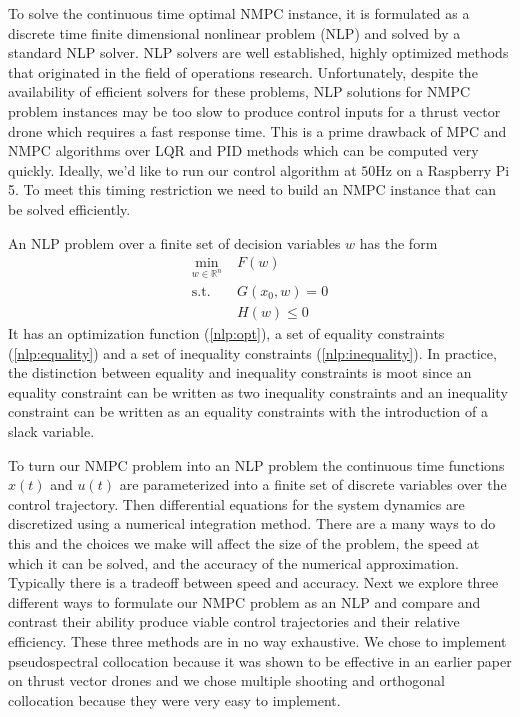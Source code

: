 \documentclass[]{article}
\newcommand{\mpc}{MPC}
\newcommand{\nmpc}{NMPC}
\newcommand{\R}{\mathbb{R}}
\begin{document}
	To solve the continuous time optimal {\nmpc} instance, it is formulated as a discrete time finite dimensional nonlinear problem (NLP) and solved by a standard NLP solver.  NLP solvers are well established, highly optimized methods that originated in the field of operations research. Unfortunately, despite the availability of efficient solvers for these problems, NLP solutions for {\nmpc} problem instances may be too slow to produce control inputs for a thrust vector drone which requires a fast response time. This is a prime drawback of {\mpc} and {\nmpc} algorithms over LQR and PID  methods which can be computed very quickly.
	Ideally, we'd like to run our control algorithm at $50$Hz on a Raspberry Pi 5.  To meet this timing restriction we need to build an {\nmpc} instance that can be solved efficiently. 

	An NLP problem over a finite set of decision variables $w$ has the form 
	\begin{align}
		\min_{w \in \R^n} \; &  F(w) \label{nlp:opt} \\
		\text{s.t.} \;\; & G(x_0, w) = 0 \label{nlp:equality} \\
		&	H(w) \leq 0 \label{nlp:inequality}
	\end{align}
	It has an optimization function (\ref{nlp:opt}),  a set of equality constraints (\ref{nlp:equality}) and a set of inequality constraints (\ref{nlp:inequality}).
	In practice, the distinction between equality and inequality constraints is moot since an equality constraint can be written as two inequality constraints  and  an inequality constraint can be written as an equality constraints with the introduction of a slack variable. 

	To turn our {\nmpc} problem into an NLP problem  the continuous time functions $x(t)$ and $u(t)$ are parameterized into a finite set of discrete variables over the control trajectory.  Then differential equations for the system dynamics are discretized using a numerical integration method.  There are a many ways to do this and the choices we make will affect the size of the problem, the speed at which it can be solved, and the accuracy of the numerical approximation. Typically there is a tradeoff between speed and accuracy.  
	Next we explore three different ways to formulate our {\nmpc} problem as an NLP and compare and contrast their ability produce viable control trajectories and their relative efficiency.  These three methods are in no way exhaustive. We chose to implement pseudospectral collocation because it was shown to be effective in an earlier paper on thrust vector drones \citep{TVCDrone} and we chose multiple shooting and orthogonal collocation because they were very easy to implement.
\end{document}
